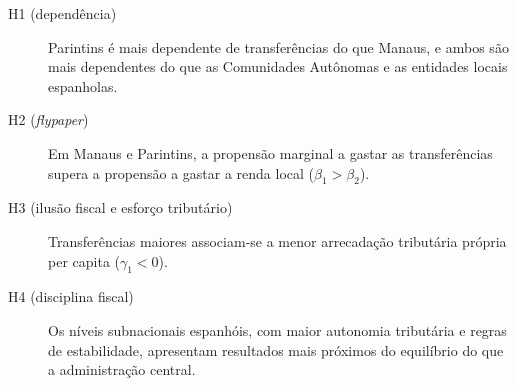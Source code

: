 \begin{description}
\item[H1 (dependência)] Parintins é mais dependente de transferências do que Manaus, e ambos são mais dependentes do que as Comunidades Autônomas e as entidades locais espanholas.
\item[H2 (\textit{flypaper})] Em Manaus e Parintins, a propensão marginal a gastar as transferências supera a propensão a gastar a renda local ($\beta_1>\beta_2$).
\item[H3 (ilusão fiscal e esforço tributário)] Transferências maiores associam-se a menor arrecadação tributária própria per capita ($\gamma_1<0$).
\item[H4 (disciplina fiscal)] Os níveis subnacionais espanhóis, com maior autonomia tributária e regras de estabilidade, apresentam resultados mais próximos do equilíbrio do que a administração central.
\end{description}
